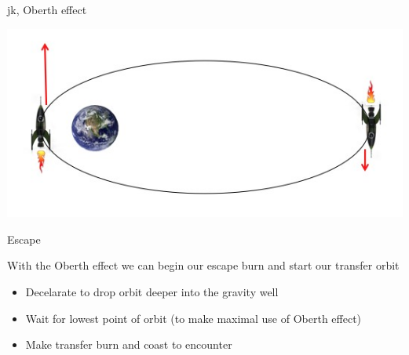 \begin{frame}[t]{jk, Oberth effect}
    \begin{block}{}
        \includegraphics[width=\textwidth]{images/obert_effect}
    \end{block}
\end{frame}
\begin{frame}[t]{Escape}
    \begin{block}{}
        With the Oberth effect we can begin our escape burn and start our transfer orbit
    \end{block}
    \begin{block}{}
        \begin{itemize}
            \item Decelarate to drop orbit deeper into the gravity well
            \item Wait for lowest point of orbit (to make maximal use of Oberth effect)
            \item Make transfer burn and coast to encounter
        \end{itemize}
    \end{block}
\end{frame}
